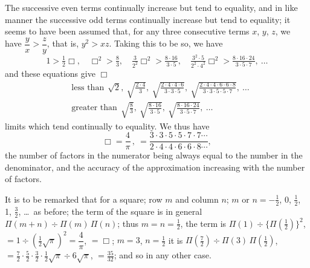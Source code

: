 \documentclass[11pt,a4paper]{article}
\begin{document}
The successive even terms continually increase but tend to equality, and in like manner the successive odd terms continually increase but tend to equality; it seems to have been assumed that, for any three consecutive terms $x$, $y$, $z$, we have $\dfrac{y}{x} > \dfrac{z}{y}$, that is, $y^2 > xz$. Taking this to be so, we have
\[
1 > \tfrac{1}{2}\Box,\quad \Box^2 > \tfrac{8}{3},\quad \tfrac{3}{2^2}\Box^2 > \tfrac{8 \cdot 16}{3 \cdot 5},\quad \tfrac{3^2 \cdot 5}{2^2 \cdot 4^2}\Box^2 > \tfrac{8 \cdot 16 \cdot 24}{3 \cdot 5 \cdot 7},\ \ldots
\]
and these equations give $\Box$
\begin{align*}
&\text{less than}\ \ \sqrt{2},\ \sqrt{\tfrac{2 \cdot 4}{3}},\ \sqrt{\tfrac{2 \cdot 4 \cdot 4 \cdot 6}{3 \cdot 3 \cdot 5}},\ \sqrt{\tfrac{2 \cdot 4 \cdot 4 \cdot 6 \cdot 6 \cdot 8}{3 \cdot 3 \cdot 5 \cdot 5 \cdot 7}},\ \ldots\\
&\text{greater than}\ \ \sqrt{\tfrac{8}{3}},\ \sqrt{\tfrac{8 \cdot 16}{3 \cdot 5}},\ \sqrt{\tfrac{8 \cdot 16 \cdot 24}{3 \cdot 5 \cdot 7}},\ \ldots
\end{align*}
limits which tend continually to equality. We thus have
\[
\Box = \frac{4}{\pi}\,,\ = \frac{3 \cdot 3 \cdot 5 \cdot 5 \cdot 7 \cdot 7 \cdots}{2 \cdot 4 \cdot 4 \cdot 6 \cdot 6 \cdot 8 \cdots},
\]
the number of factors in the numerator being always equal to the number in the denominator, and the accuracy of the approximation increasing with the number of factors.

It is to be remarked that for a square; row $m$ and column $n$; $m$ or $n = -\tfrac{1}{2}$, 0, $\tfrac{1}{2}$, 1, $\tfrac{3}{2}$, \ldots\ as before; the term of the square is in general $\Pi(m + n) \div \Pi(m)\,\Pi(n)$; thus $m = n = \tfrac{1}{2}$, the term is $\Pi(1) \div \{\Pi(\tfrac{1}{2})\}^2$, $= 1 \div (\tfrac{1}{2}\sqrt{\pi})^2 = \dfrac{4}{\pi}$, $= \Box$; $m = 3$, $n = \tfrac{1}{2}$ it is $\Pi(\tfrac{7}{2}) \div \Pi(3)\,\Pi(\tfrac{1}{2})$, $= \tfrac{7}{2}\cdot\tfrac{5}{2}\cdot\tfrac{3}{2}\cdot\tfrac{1}{2}\sqrt{\pi} \div 6\sqrt{\pi}$, $= \tfrac{35}{32}$; and so in any other case.
\end{document}
